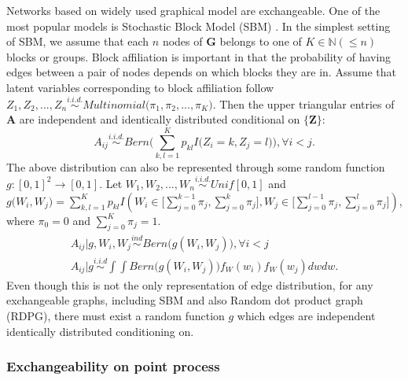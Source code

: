 \documentclass[12pt]{article}
\theoremstyle{definition}
\begin{document}
Networks based on  widely used graphical model are exchangeable. One of the most popular models is Stochastic Block Model (SBM) \citep{holland1983stochastic}. In the simplest setting of SBM, we assume that each $n$ nodes of $\mathbf{G}$ belongs to one of $K \in \mathbb{N} (\leq n)$ blocks or groups. Block affiliation is important in that the probability of having edges between a pair of nodes depends on which blocks they are in.  Assume that latent variables corresponding to block affiliation follow $Z_{1}, Z_{2}, ... , Z_{n} \overset{i.i.d.}{\sim} Multinomial\big( \pi_{1}, \pi_{2}, ... , \pi_{K} \big)$. Then the upper triangular entries of $\mathbf{A}$ are independent and identically distributed conditional on $\{\mathbf{Z}\}$:
	\begin{equation} 
	A_{ij} \overset{i.i.d.}{\sim} Bern\big( \sum\limits_{k,l=1}^{K} p_{kl} I\big( Z_{i} = k, Z_{j} = l  \big)    \big), \forall  i < j.
	\end{equation}
The above distribution can also be represented through some random function $g : [0,1]^2 \rightarrow [0,1]$. Let $W_{1}, W_{2}, ... , W_{n} \overset{i.i.d.}{\sim} Unif[0,1]$ and $g\big( W_{i}, W_{j} \big) = \sum\limits_{k,l=1}^{K} p_{kl} I \left( W_{i} \in \big[ \sum\limits_{j=0}^{k-1} \pi_{j}, \sum\limits_{j=0}^{k} \pi_{j}   \big] , W_{j} \in \big[ \sum\limits_{j=0}^{l-1} \pi_{j}, \sum\limits_{j=0}^{l} \pi_{j}  \big]  \right)$, where $\pi_{0} = 0$ and $\sum\limits_{j=0}^{K}  \pi_{j} = 1$. 
\begin{equation} 
\begin{gathered}
A_{ij} \big| g, W_{i}, W_{j} \overset{ind}{\sim} Bern \big( g(W_{i}, W_{j})  \big), \forall i < j \\ 
A_{ij} \big| g \overset{i.i.d}{\sim} \int \int Bern \big( g(W_{i}, W_{j}) \big) f_{W}(w_{i}) f_{W}(w_{j}) dw dw.  
\end{gathered}
\end{equation}
Even though this is not the only representation of edge distribution, for any exchangeable graphs, including SBM and also Random dot product graph (RDPG), there must exist a random function $g$ which edges are independent identically distributed conditioning on. 
	
\subsubsection{Exchangeability on point process}
	
\end{document}
